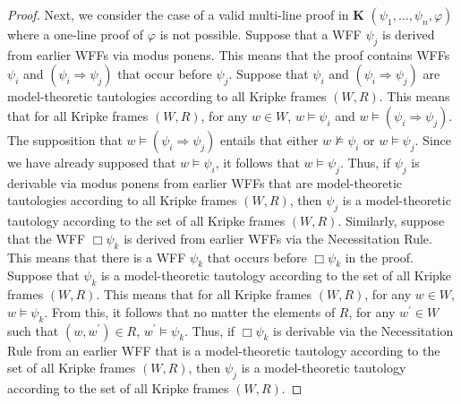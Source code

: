 \documentclass[11pt]{article}
\theoremstyle{definition}
\theoremstyle{remark}
\begin{document}
\begin{proof}
    Next, we consider the case of a valid multi-line proof in \textbf{K} $(\psi_{1},\dots,\psi_{n},\varphi)$ where a one-line proof of $\varphi$ is not possible. Suppose that a WFF $\psi_{j}$ is derived from earlier WFFs via modus ponens. This means that the proof contains WFFs $\psi_{i}$ and $(\psi_{i}\Rightarrow\psi_{j})$ that occur before $\psi_{j}$. Suppose that $\psi_{i}$ and $(\psi_{i}\Rightarrow\psi_{j})$ are model-theoretic tautologies according to all Kripke frames $(W,R)$. This means that for all Kripke frames $(W,R)$, for any $w\in W$, $w\vDash \psi_{i}$ and $w\vDash (\psi_{i}\Rightarrow\psi_{j})$. The supposition that $w\vDash (\psi_{i}\Rightarrow\psi_{j})$ entails that either $w\not\vDash \psi_{i}$ or $w\vDash \psi_{j}$. Since we have already supposed that $w\vDash \psi_{i}$, it follows that $w\vDash \psi_{j}$. Thus, if $\psi_{j}$ is derivable via modus ponens from earlier WFFs that are model-theoretic tautologies according to all Kripke frames $(W,R)$, then $\psi_{j}$ is a model-theoretic tautology according to the set of all Kripke frames $(W,R)$. Similarly, suppose that the WFF $\Box\psi_{k}$ is derived from earlier WFFs via the Necessitation Rule. This means that there is a WFF $\psi_{k}$ that occurs before $\Box\psi_{k}$ in the proof. Suppose that $\psi_{k}$ is a model-theoretic tautology according to the set of all Kripke frames $(W,R)$. This means that for all Kripke frames $(W,R)$, for any $w\in W$, $w\vDash \psi_{k}$. From this, it follows that no matter the elements of $R$, for any $w^{\prime}\in W$ such that $(w,w^{\prime})\in R$, $w^{\prime}\vDash\psi_{k}$. Thus, if $\Box\psi_{k}$ is derivable via the Necessitation Rule from an earlier WFF that is a model-theoretic tautology according to the set of all Kripke frames $(W,R)$, then $\psi_{j}$ is a model-theoretic tautology according to the set of all Kripke frames $(W,R)$.\par
    

\end{proof}
\end{document}
